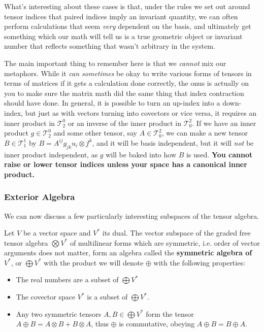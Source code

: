 \documentclass[11pt]{article}
\begin{document}
What's interesting about these cases is that, under the rules we set out around tensor indices that paired indices imply an invariant quantity, we can often perform calculations that seem \emph{very} dependent on the basis, and ultimately get something which our math will tell us is a true geometric object or invariant number that reflects something that wasn't arbitrary in the system.

The main important thing to remember here is that we \emph{cannot} mix our metaphors. While it \emph{can sometimes} be okay to write various forms of tensors in terms of matrices if it gets a calculation done correctly, the onus is actually on you to make sure the matrix math did the same thing that index contraction should have done. In general, it is possible to turn an up-index into a down-index, but just as with vectors turning into covectors or vice versa, it requires an inner product in $\mathcal T_2^0$ or an inverse of the inner product in $\mathcal T_0^2$. If we have an inner product $g \in \mathcal T_2^0$ and some other tensor, say $A\in \mathcal T^2_0$, we can make a new tensor $B \in \mathcal T^1_1$ by $B = A^{ij} g_{jk} u_i \otimes f^k$, and it will be basis independent, but it will \emph{not} be inner product independent, as $g$ will be baked into how $B$ is used. \textbf{You cannot raise or lower tensor indices unless your space has a canonical inner product.}

\subsubsection{Exterior Algebra}

We can now discuss a few particularly interesting subspaces of the tensor algebra.

\begin{definition}
Let $V$ be a vector space and $V^*$ its dual. The vector subspace of the graded free tensor algebra $\bigotimes V^*$ of multilinear forms which are symmetric, i.e. order of vector arguments does not matter, form an algebra called the \textbf{symmetric algebra of } $V^*$, or $\bigoplus V^*$ with the product we will denote $\oplus$ with the following properties: \begin{itemize}
\item The real numbers are a subset of $\bigoplus V^*$
\item The covector space $V^*$ is a subset of $\bigoplus V^*$.
\item Any two symmetric tensors $A, B \in \bigoplus V^*$ form the tensor $A \oplus B = A \otimes B + B \otimes A$, thus $\oplus$ is commutative, obeying $A \oplus B = B \oplus A$.
\end{itemize}
\end{definition}
\end{document}
